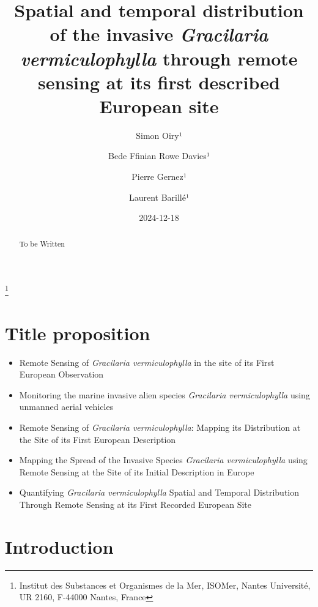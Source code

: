 \documentclass[
  letterpaper,
  DIV=11,
  numbers=noendperiod]{scrartcl}
\title{Spatial and temporal distribution of the invasive
\emph{Gracilaria vermiculophylla} through remote sensing at its first
described European site}
\author{Simon Oiry¹ \and Bede Ffinian Rowe Davies¹ \and Pierre
Gernez¹ \and Laurent Barillé¹}
\date{2024-12-18}
\begin{document}
\maketitle
\begin{abstract}
To be Written
\end{abstract}


\footnote{Institut des Substances et Organismes de la Mer, ISOMer,
  Nantes Université, UR 2160, F-44000 Nantes, France}

\section{Title proposition}\label{title-proposition}

\begin{itemize}
\item
  Remote Sensing of \emph{Gracilaria vermiculophylla} in the site of its
  First European Observation
\item
  Monitoring the marine invasive alien species \emph{Gracilaria
  vermiculophylla} using unmanned aerial vehicles
\item
  Remote Sensing of \emph{Gracilaria vermiculophylla}: Mapping its
  Distribution at the Site of its First European Description
\item
  Mapping the Spread of the Invasive Species \emph{Gracilaria
  vermiculophylla} using Remote Sensing at the Site of its Initial
  Description in Europe
\item
  Quantifying \emph{Gracilaria vermiculophylla} Spatial and Temporal
  Distribution Through Remote Sensing at its First Recorded European
  Site
\end{itemize}

\section{Introduction}\label{introduction}
\end{document}
